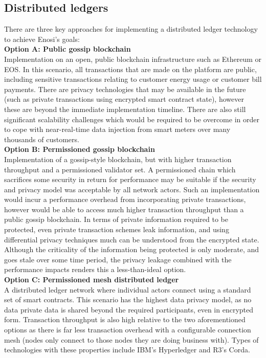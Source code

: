 \documentclass{article}
\theoremstyle{definition}
\theoremstyle{plain} %
\begin{document}
\subsection{Distributed ledgers}

There are three key approaches for implementing a distributed ledger technology to achieve Enosi's goals:\\

\noindent \textbf{Option A: Public gossip blockchain} \\

\noindent Implementation on an open, public blockchain infrastructure such as Ethereum or EOS. In this scenario, all transactions that are made on the platform are public, including sensitive transactions relating to customer energy usage or customer bill payments. There are privacy technologies that may be available in the future (such as private transactions using encrypted smart contract state), however these are beyond the immediate implementation timeline. There are also still significant scalability challenges which would be required to be overcome in order to cope with near-real-time data injection from smart meters over many thousands of customers. \\

\noindent \textbf{Option B: Permissioned gossip blockchain} \\

\noindent Implementation of a gossip-style blockchain, but with higher transaction throughput and a permissioned validator set. A permissioned chain which sacrifices some security in return for performance may be suitable if the security and privacy model was acceptable by all network actors. Such an implementation would incur a performance overhead from incorporating private transactions, however would be able to access much higher transaction throughput than a public gossip blockchain. In terms of private information required to be protected, even private transaction schemes leak information, and using differential privacy techniques much can be understood from the encrypted state. Although the criticality of the information being protected is only moderate, and goes stale over some time period, the privacy leakage combined with the performance impacts renders this a less-than-ideal option.\\

\noindent \textbf{Option C: Permissioned mesh distributed ledger} \\

\noindent A distributed ledger network where individual actors connect using a standard set of smart contracts. This scenario has the highest data privacy model, as no data private data is shared beyond the required participants, even in encrypted form. Transaction throughput is also high relative to the two aforementioned options as there is far less transaction overhead with a configurable connection mesh (nodes only connect to those nodes they are doing business with). Types of technologies with these properties include IBM's Hyperledger and R3's Corda.
\end{document}
